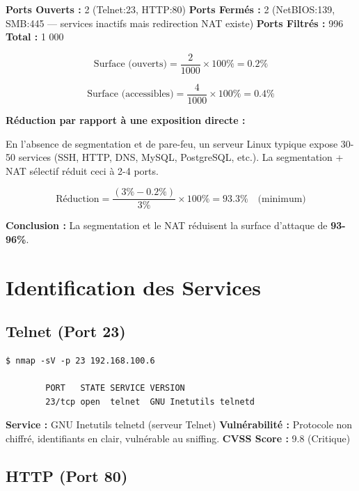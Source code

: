 \documentclass[12pt,a4paper,openany]{report}
\begin{document}
\textbf{Ports Ouverts :} 2 (Telnet:23, HTTP:80)
\textbf{Ports Fermés :} 2 (NetBIOS:139, SMB:445 — services inactifs mais redirection NAT existe)
\textbf{Ports Filtrés :} 996
\textbf{Total :} 1 000

\begin{equation}
	\text{Surface (ouverts)} = \frac{2}{1000} \times 100\% = \boxed{0.2\%}
\end{equation}

\begin{equation}
	\text{Surface (accessibles)} = \frac{4}{1000} \times 100\% = \boxed{0.4\%}
\end{equation}

\textbf{Réduction par rapport à une exposition directe :}

En l'absence de segmentation et de pare-feu, un serveur Linux typique expose 30-50 services (SSH, HTTP, DNS, MySQL, PostgreSQL, etc.). La segmentation + NAT sélectif réduit ceci à 2-4 ports.

\begin{equation}
	\text{Réduction} = \frac{(3\% - 0.2\%)}{3\%} \times 100\% = \boxed{93.3\%} \quad \text{(minimum)}
\end{equation}

\textcolor{success}{\checkmark} \textbf{Conclusion :} La segmentation et le NAT réduisent la surface d'attaque de \textbf{93-96\%}.

\section{Identification des Services}

\subsection{Telnet (Port 23)}

\begin{lstlisting}[caption=Detection version Telnet]
		$ nmap -sV -p 23 192.168.100.6
		
		PORT   STATE SERVICE VERSION
		23/tcp open  telnet  GNU Inetutils telnetd
	\end{lstlisting}

\textbf{Service :} GNU Inetutils telnetd (serveur Telnet)
\textbf{Vulnérabilité :} Protocole non chiffré, identifiants en clair, vulnérable au sniffing.
\textbf{CVSS Score :} 9.8 (Critique)

\subsection{HTTP (Port 80)}
\end{document}
